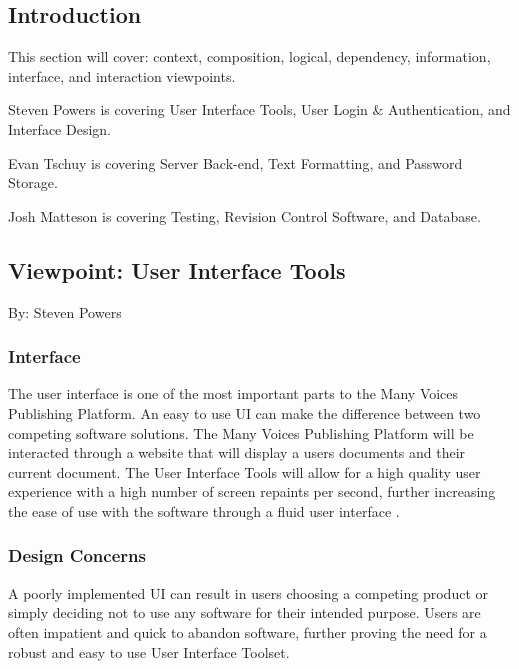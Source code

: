 \documentclass[letterpaper, 10pt, draftclsnofoot, compsoc, onecolumn]{IEEEtran}
\begin{document}
\subsection{Introduction}
{\noindent This section will cover: context, composition, logical, dependency, information, interface, and interaction viewpoints. \par}

{\noindent Steven Powers is covering User Interface Tools, User Login \& Authentication, and Interface Design.  \par}
{\noindent Evan Tschuy is covering Server Back-end, Text Formatting, and Password Storage.  \par}
{\noindent Josh Matteson is covering Testing, Revision Control Software, and Database.  \par}



\subsection{Viewpoint: User Interface Tools}
{\noindent By: Steven Powers \par}

\subsubsection{Interface}
{\noindent The user interface is one of the most important parts to the Many
Voices Publishing Platform. An easy to use UI can make the difference between
two competing software solutions. The Many Voices Publishing Platform will be
interacted through a website that will display a users documents and their current
document. The User Interface Tools will allow for a high quality user experience
with a high number of screen repaints per second, further increasing the ease of use
with the software through a fluid user interface \cite{Eisenberg}.\par}

\subsubsection{Design Concerns}
{\noindent A poorly implemented UI can result in users choosing a competing
product or simply deciding not to use any software for their intended purpose.
Users are often impatient and quick to abandon software,
further proving the need for a robust and easy to use User Interface Toolset.  \par}
\end{document}
